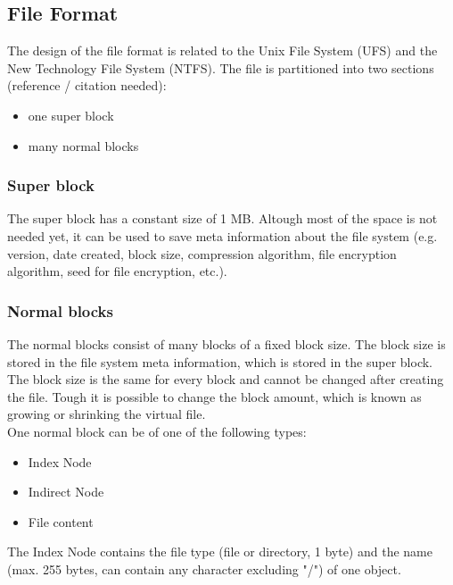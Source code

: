 \documentclass[a4paper,12pt]{article}
\begin{document}
\subsection{File Format}

The design of the file format is related to the Unix File System (UFS) and the New Technology File System (NTFS). The file is partitioned into two sections (reference / citation needed):

\begin{itemize}
  \item one super block
  \item many normal blocks
\end{itemize}

\subsubsection{Super block}

The super block has a constant size of 1 MB. Altough most of the space is not needed yet, it can be used to save meta information about the file system (e.g. version, date created, block size, compression algorithm,
file encryption algorithm, seed for file encryption, etc.).

\subsubsection{Normal blocks}

The normal blocks consist of many blocks of a fixed block size. The block size is stored in the file system meta information, which is stored in the super block. The block size is the same for every block and cannot be changed after creating the file. Tough it is possible to change the block amount, which is known as growing or shrinking the virtual file.\\

One normal block can be of one of the following types:

\begin{itemize}
  \item Index Node
  \item Indirect Node
  \item File content
\end{itemize}


The Index Node contains the file type (file or directory, 1 byte) and the name (max. 255 bytes, can contain any character excluding "/") of one object.\\
\end{document}
